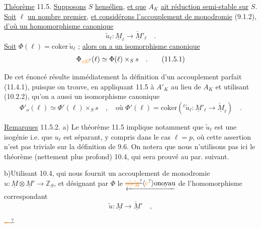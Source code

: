 \uline{Théorème} 11.5. \uline{Supposons} $S$ \uline{hensélien}, \uline{et que} $A_K$ \uline{ait réduction semi-stable sur} $S$. \uline{Soit} $\ell$ \uline{un nombre premier}, \uline{et considérons l'accouplement de monodromie} (9.1.2), \uline{d'où un homomorphisme canonique}
\[
 \widetilde u_\ell:\underline M_\ell\longrightarrow\underline{\check M}'_\ell\quad .
\]
\uline{Soit} $\Phi(\ell)=\mathrm{coker}\,\widetilde u_\ell$ ; \uline{alors on a un isomorphisme canonique}
\[
 \Phi_{\unsure{o|0}}(\ell)\simeq\Phi(\ell)\times_S s\quad .\tag*{(11.5.1)}
\]

De cet énoncé résulte immédiatement la définition d'un accouplement parfait (11.4.1), puisque on trouve, en appliquant 11.5 à $A'_K$ au lieu de $A_K$ et utilisant (10.2.2), qu'on a aussi un isomorphisme canonique
\[
 \Phi'_o(\ell)\simeq\Phi'(\ell)\times_S s\quad,\quad\text{où }\Phi'(\ell)=\mathrm{coker}({}^t\widetilde u_\ell:\underline M'_\ell\longrightarrow\underline{\check M}_\ell)\quad .
\]

\uline{Remarques} 11.5.2. a) Le théorème 11.5 implique notamment que $\widetilde u_\ell$ est une isogénie i.e. que $u_\ell$ est séparant, y compris dans le cas $\ell=p$, où cette assertion n'est pas triviale sur la définition de 9.6. On notera que nous n'utilisons pas ici le théorème (nettement plus profond) 10.4, qui sera prouvé au par. suivant.

b)\quad Utilisant 10.4, qui nous fournit un accouplement de monodromie $u:\underline M\otimes\underline M'\longrightarrow\mathbb Z_S$, et désignant par $\Phi$ le $\underleftarrow{\text{\deleted{\unsure{o|c|g}}\handwritten{\inserted{\unsure{c}}}onoyau}}$ de l'homomorphisme correspondant
\[
 \widetilde u:\underline M\longrightarrow\underline{\check M}'\quad ,
\]

$\deleted{\unsure{\twoheadleftarrow}}$

